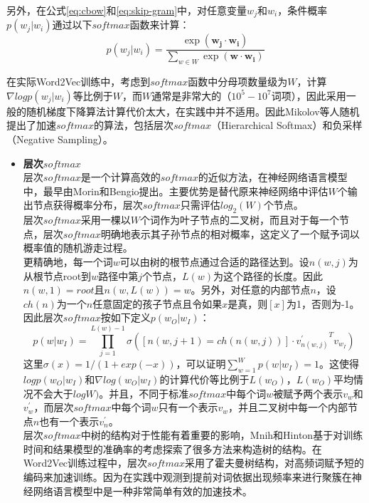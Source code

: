 \documentclass[master]{njuthesis}
\begin{document}
另外，在公式\ref{eq:cbow}和\ref{eq:skip-gram}中，对任意变量$w_j$和$w_i$，条件概率$p(w_j|w_i)$通过以下$softmax$函数来计算：
		\begin{equation}\label{eq:softmax}
		p(w_{j}|w_{i})=\frac{\exp(\mathbf{w_{j}} \cdot \mathbf{w_{i}})}{\sum_{w\in W}\exp(\mathbf{w} \cdot \mathbf{w_{i}})}
		\end{equation}

在实际Word2Vec训练中，考虑到$softmax$函数中分母项数量级为$W$，计算$\nabla logp(w_{j}|w_{i})$等比例于$W$，而$W$通常是非常大的（$10^5-10^7$词项），因此采用一般的随机梯度下降算法计算代价太大，在实践中并不适用。因此Mikolov等人随机提出了加速$softmax$的算法，包括层次$softmax$（Hierarchical Softmax）和负采样（Negative Sampling）\cite{mikolov2013distributed}。

\begin{itemize}
\item \textbf{层次$softmax$}\\
		层次$softmax$是一个计算高效的$softmax$的近似方法，在神经网络语言模型中，最早由Morin和Bengio提出\cite{morin2005hierarchical}。主要优势是替代原来神经网络中评估$W$个输出节点获得概率分布，层次$softmax$只需评估$log_2(W)$个节点。\\
		层次$softmax$采用一棵以$W$个词作为叶子节点的二叉树，而且对于每一个节点，层次$softmax$明确地表示其子孙节点的相对概率，这定义了一个赋予词以概率值的随机游走过程。\\
		更精确地，每一个词$w$可以由树的根节点通过合适的路径达到。设$n(w,j)$为从根节点root到$w$路径中第$j$个节点，$L(w)$为这个路径的长度。因此$n(w,1)=root$且$n(w,L(w))=w$。另外，对任意的内部节点$n$，设$ch(n)$为一个$n$任意固定的孩子节点且令如果$x$是真，则$\left [ x \right ]$为1，否则为-1。因此层次$softmax$按如下定义$p(w_O|w_I)$：
		\begin{equation}
		p(w|w_I)=\prod_{j=1}^{L(w)-1} \sigma(\left [ n(w,j+1)=ch(n(w,j)) \right ] \cdot {v_{n(w,j)}^{'}}^Tv_{w_I})
		\end{equation}
		这里$\sigma(x)=1/(1+exp(-x))$，可以证明$\sum_{w=1}^{W}p(w|w_I)=1$。这使得$logp(w_O|w_I)$和$\nabla log(w_O|w_I)$的计算代价等比例于$L(w_O)$，$L(w_O)$平均情况不会大于$logW)$。并且，不同于标准$softmax$中每个词$w$被赋予两个表示$v_w$和$v_w^{'}$，而层次$softmax$中每个词$w$只有一个表示$v_w$，并且二叉树中每一个内部节点$n$也有一个表示$v_n^{'}$。\\
		层次$softmax$中树的结构对于性能有着重要的影响，Mnih和Hinton基于对训练时间和结果模型的准确率的考虑探索了很多方法来构造树的结构\cite{mnih2009scalable}。在Word2Vec训练过程中，层次$softmax$采用了霍夫曼树结构，对高频词赋予短的编码来加速训练。因为在实践中观测到提前对词依据出现频率来进行聚簇在神经网络语言模型中是一种非常简单有效的加速技术\cite{mikolov2011extensions,mikolov2013efficient}。
		

\end{itemize}
\end{document}

